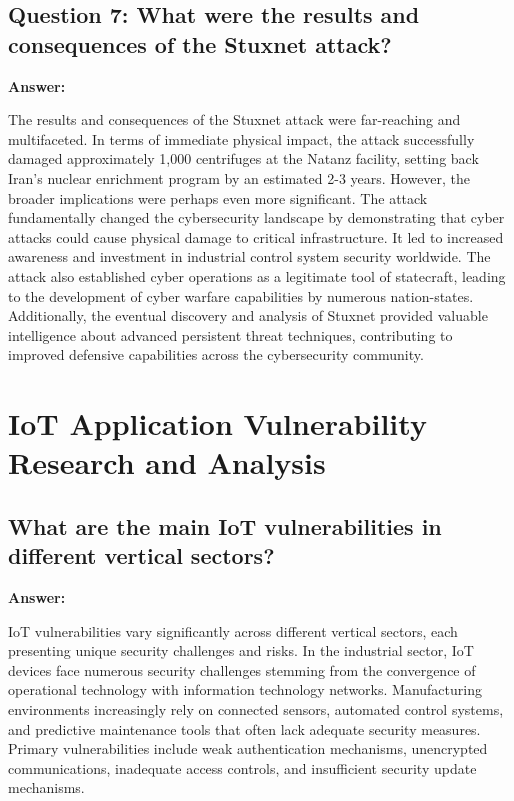 \documentclass[12pt,a4paper]{article}
\begin{document}
\subsection{Question 7: What were the results and consequences of the Stuxnet attack?}

\textbf{Answer:}

The results and consequences of the Stuxnet attack were far-reaching and multifaceted. In terms of immediate physical impact, the attack successfully damaged approximately 1,000 centrifuges at the Natanz facility, setting back Iran's nuclear enrichment program by an estimated 2-3 years. However, the broader implications were perhaps even more significant. The attack fundamentally changed the cybersecurity landscape by demonstrating that cyber attacks could cause physical damage to critical infrastructure. It led to increased awareness and investment in industrial control system security worldwide. The attack also established cyber operations as a legitimate tool of statecraft, leading to the development of cyber warfare capabilities by numerous nation-states. Additionally, the eventual discovery and analysis of Stuxnet provided valuable intelligence about advanced persistent threat techniques, contributing to improved defensive capabilities across the cybersecurity community.

\section{IoT Application Vulnerability Research and Analysis}

\subsection{What are the main IoT vulnerabilities in different vertical sectors?}

\textbf{Answer:}

IoT vulnerabilities vary significantly across different vertical sectors, each presenting unique security challenges and risks. In the industrial sector, IoT devices face numerous security challenges stemming from the convergence of operational technology with information technology networks. Manufacturing environments increasingly rely on connected sensors, automated control systems, and predictive maintenance tools that often lack adequate security measures. Primary vulnerabilities include weak authentication mechanisms, unencrypted communications, inadequate access controls, and insufficient security update mechanisms.
\end{document}
